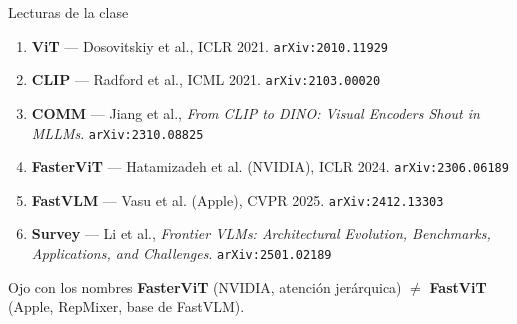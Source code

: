 \documentclass[aspectratio=169,10pt]{beamer}
\begin{document}
\begin{frame}{Lecturas de la clase}
	\small
	\begin{enumerate}
		\item \textbf{ViT} — Dosovitskiy et al., ICLR 2021. \texttt{arXiv:2010.11929}
		\item \textbf{CLIP} — Radford et al., ICML 2021. \texttt{arXiv:2103.00020}
		\item \textbf{COMM} — Jiang et al., \emph{From CLIP to DINO: Visual Encoders Shout in MLLMs}. \texttt{arXiv:2310.08825}
		\item \textbf{FasterViT} — Hatamizadeh et al. (NVIDIA), ICLR 2024. \texttt{arXiv:2306.06189}
		\item \textbf{FastVLM} — Vasu et al. (Apple), CVPR 2025. \texttt{arXiv:2412.13303}
		\item \textbf{Survey} — Li et al., \emph{Frontier VLMs: Architectural Evolution, Benchmarks, Applications, and Challenges}. \texttt{arXiv:2501.02189}
	\end{enumerate}
	\vspace{2mm}
	\begin{alertblock}{Ojo con los nombres}
		\textbf{FasterViT} (NVIDIA, atención jerárquica) $\neq$ \textbf{FastViT} (Apple, RepMixer, base de FastVLM).
	\end{alertblock}
\end{frame}
\end{document}
